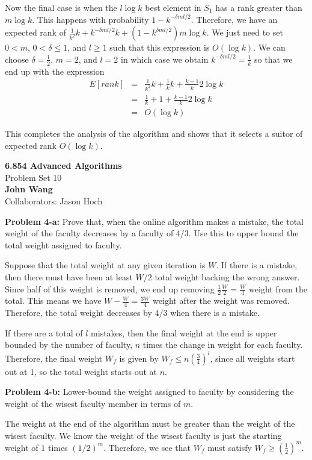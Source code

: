 \documentclass[psamsfonts]{amsart}
\newenvironment{sol}{\vspace{0.25cm}{\large \bfseries Solution:}}{\qedsymbol}
\newenvironment{prob}[1]{\begin{framed}{\large \bfseries Problem #1:}}{\end{framed}}
\newcommand{\makenewtitle}{
    \begin{center}
    {\huge \bfseries 6.854 Advanced Algorithms} \\
    Problem Set 10\\
    \vspace{0.25cm}
    {\bfseries John Wang} \\
    Collaborators: Jason Hoch 
    \end{center}
    \vspace{0.5cm}
}
\begin{document}
\begin{sol}
Now the final case is when the $l \log k$ best element in $S_1$ has a rank greater than $m \log k$. This happens with probability $1 - k^{- \delta m l / 2}$. Therefore, we have an expected rank of $\frac{1}{k^2} k + k^{-\delta m l /2} k + (1 - k^{\delta m l /2}) m \log k$. We just need to set $0 < m$, $0 < \delta \leq 1$, and $l \geq 1$  such that this expression is $O(\log k)$. We can choose $\delta = \frac{1}{2}$, $m = 2$, and $l = 2$ in which case we obtain $k^{-\delta m l / 2} = \frac{1}{k}$ so that we end up with the expression
\begin{eqnarray}
E[rank] &=& \frac{1}{k^2}{k} + \frac{1}{k} k + \frac{k-1}{k} 2 \log k \\
&=& \frac{1}{k} + 1 + \frac{k-1}{k} 2 \log k \\
&=& O(\log k)
\end{eqnarray}

This completes the analysis of the algorithm and shows that it selects a suitor of expected rank $O(\log k)$. 
\end{sol}


\newpage
\makenewtitle

\begin{prob}{4-a}
Prove that, when the online algorithm makes a mistake, the total weight of the faculty decreases by a faculty of $4/3$. Use this to upper bound the total weight assigned to faculty.
\end{prob}
\begin{sol}
Suppose that the total weight at any given iteration is $W$. If there is a mistake, then there must have been at least $W/2$ total weight backing the wrong answer. Since half of this weight is removed, we end up removing $\frac{1}{2} \frac{W}{2} = \frac{W}{4}$ weight from the total. This means we have $W - \frac{W}{4} = \frac{3W}{4}$ weight after the weight was removed. Therefore, the total weight decreases by $4/3$ when there is a mistake. 

If there are a total of $l$ mistakes, then the final weight at the end is upper bounded by the number of faculty, $n$ times the change in weight for each faculty. Therefore, the final weight $W_f$ is given by $W_f \leq n \left( \frac{3}{4} \right)^l$, since all weights start out at 1, so the total weight starts out at $n$. 
\end{sol}

\begin{prob}{4-b}
Lower-bound the weight assigned to faculty by considering the weight of the wisest faculty member in terms of $m$. 
\end{prob}
\begin{sol}
The weight at the end of the algorithm must be greater than the weight of the wisest faculty. We know the weight of the wisest faculty is just the starting weight of $1$ times $(1/2)^{m}$. Therefore, we see that $W_f$ must satisfy $W_f \geq \left( \frac{1}{2} \right)^m$. 
\end{sol}
\end{document}

